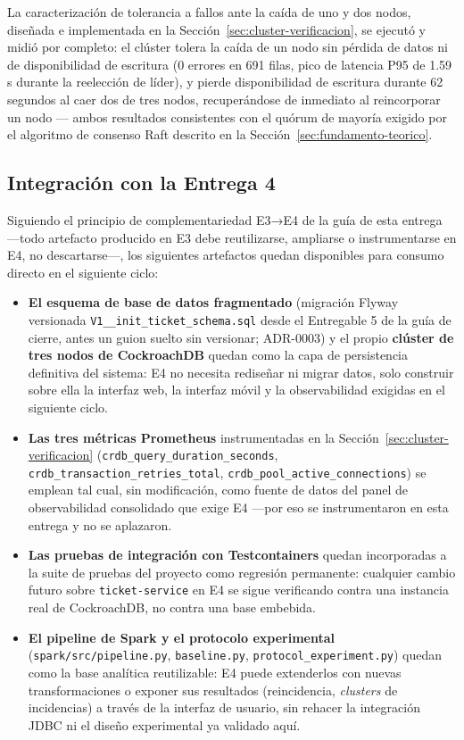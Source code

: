 La caracterización de tolerancia a fallos ante la caída de uno y dos nodos, diseñada e
implementada en la Sección~\ref{sec:cluster-verificacion}, se ejecutó y midió por completo: el
clúster tolera la caída de un nodo sin pérdida de datos ni de disponibilidad de escritura (0
errores en 691 filas, pico de latencia P95 de 1.59\,s durante la reelección de líder), y pierde
disponibilidad de escritura durante 62 segundos al caer dos de tres nodos, recuperándose de
inmediato al reincorporar un nodo — ambos resultados consistentes con el quórum de mayoría
exigido por el algoritmo de consenso Raft descrito en la Sección~\ref{sec:fundamento-teorico}.

\subsection{Integración con la Entrega 4}

Siguiendo el principio de complementariedad E3→E4 de la guía de esta entrega —todo artefacto
producido en E3 debe reutilizarse, ampliarse o instrumentarse en E4, no descartarse—, los
siguientes artefactos quedan disponibles para consumo directo en el siguiente ciclo:

\begin{itemize}[leftmargin=1.5em]
    \item \textbf{El esquema de base de datos fragmentado} (migración Flyway versionada
        \texttt{V1\_\_init\_ticket\_schema.sql} desde el Entregable 5 de la guía de cierre,
        antes un guion suelto sin versionar; ADR-0003) y el propio \textbf{clúster de tres
        nodos de CockroachDB} quedan como la capa de
        persistencia definitiva del sistema: E4 no necesita rediseñar ni migrar datos, solo construir
        sobre ella la interfaz web, la interfaz móvil y la observabilidad exigidas en el siguiente
        ciclo.
    \item \textbf{Las tres métricas Prometheus} instrumentadas en la
        Sección~\ref{sec:cluster-verificacion} (\texttt{crdb\_query\_duration\_seconds},
        \texttt{crdb\_transaction\_retries\_total}, \texttt{crdb\_pool\_active\_connections}) se
        emplean tal cual, sin modificación, como fuente de datos del panel de observabilidad
        consolidado que exige E4 —por eso se instrumentaron en esta entrega y no se aplazaron.
    \item \textbf{Las pruebas de integración con Testcontainers} quedan incorporadas a la suite de
        pruebas del proyecto como regresión permanente: cualquier cambio futuro sobre
        \texttt{ticket-service} en E4 se sigue verificando contra una instancia real de CockroachDB,
        no contra una base embebida.
    \item \textbf{El pipeline de Spark y el protocolo experimental} (\texttt{spark/src/pipeline.py},
        \texttt{baseline.py}, \texttt{protocol\_experiment.py}) quedan como la base analítica
        reutilizable: E4 puede extenderlos con nuevas transformaciones o exponer sus resultados
        (reincidencia, \emph{clusters} de incidencias) a través de la interfaz de usuario, sin
        rehacer la integración JDBC ni el diseño experimental ya validado aquí.
\end{itemize}

